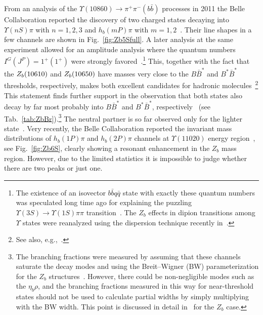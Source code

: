 From an analysis of the $\Upsilon(10860)\to \pi^+\pi^-(b\bar b)$ processes in
2011 the Belle Collaboration reported the discovery of two charged states
decaying into $\Upsilon(nS)\pi$  with $n=1,2,3$ and $h_b(mP)\pi$ with
$m=1,2$~\cite{Belle:2011aa}. Their line shapes in a few channels are shown in
Fig.~\ref{fig:Zb5Sfull}. A later analysis at the same experiment allowed
for  an amplitude analysis where the quantum numbers $I^G(J^{P})=1^+(1^{+})$
were strongly favored~\cite{Garmash:2014dhx}.\footnote{The existence of an
isovector $b\bar b q\bar q$ state with exactly these quantum numbers was
speculated long time ago for explaining the puzzling
$\Upsilon(3S)\to\Upsilon(1S)\pi\pi$
transition~\cite{Voloshin:1982ij,Anisovich:1995zu}. The $Z_b$ effects in dipion
transitions among $\Upsilon$ states were reanalyzed using the dispersion
technique recently in~\cite{Chen:2015jgl,Chen:2016mjn}. } This, together with
the fact that the $Z_b(10610)$ and $Z_b(10650)$ have masses very close  to the $B\bar B^*$
and $B^*\bar B^*$ thresholds, respectively, makes both excellent candidates for
hadronic molecules~\cite{Bondar:2011ev}\footnote{See also,
e.g.,~\cite{Zhang:2011jja,
Yang:2011rp,Danilkin:2011sh,Sun:2011uh,Cleven:2011gp,Ohkoda:2011vj, Li:2012as, 
Dong:2012hc,Wang:2013daa,Wang:2014gwa, Dias:2014pva,Karliner:2015ina}.}  This
statement finds further support in the observation that both states also decay by far most probably into $B\bar B^*$ and $B^*\bar B^*$,
respectively~\cite{Garmash:2015rfd} (see Tab.~\ref{tab:ZbBr}).\footnote{The branching
fractions were measured by assuming that these channels saturate the decay modes and using the Breit--Wigner (BW) parameterization for the $Z_b$ structures~\cite{Garmash:2015rfd}.
However, there could be non-negligible modes such as the $\eta_b\rho$, and the
branching fractions measured in this way for near-threshold states should not be
used to calculate partial widths by simply multiplying with the BW width.
This point is discussed in detail in~\cite{Chen:2015jgl} for the $Z_b$ case.}
The neutral partner is so far observed only for the lighter
state~\cite{Krokovny:2013mgx}. Very recently, the Belle Collaboration reported
the invariant mass distributions  of $h_b(1P)\pi$ and $h_b(2P)\pi$ channels at
$\Upsilon(11020)$ energy region~\cite{Abdesselam:2015zza}, see
Fig.~\ref{fig:Zb6S}, clearly showing a resonant enhancement in the $Z_b$ mass
region. However, due to the limited statistics it is impossible to judge whether
there are two peaks or just one.



